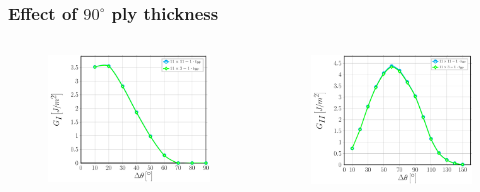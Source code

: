 \documentclass[first,firstsupp,lastsupp,last,hyperref,table]{ETHclass}
\begin{document}
\begin{frame}
\frametitle{\vspace{0.2cm}\small Effect of $90^{\circ}$ ply thickness}
\vspace{-.75cm}
\centering
\begin{columns}[c]
\centering
\begin{column}{0.5\textwidth}
\centering
\begin{figure}
\centering
\includegraphics[width=\columnwidth]{nxk-1-vf60-GI-thin.pdf}
\end{figure}
\end{column}
\begin{column}{0.5\textwidth}
\centering
\begin{figure}
\centering
\includegraphics[width=\columnwidth]{nxk-1-vf60-GII-thin.pdf}

\end{figure}
\end{column}
\end{columns}
\end{frame}
\end{document}
